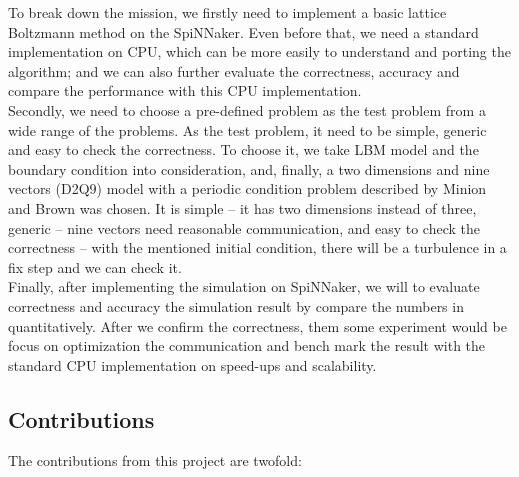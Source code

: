 To break down the mission, we firstly need to implement a basic lattice Boltzmann method on the SpiNNaker. Even before that, we need a standard implementation on CPU, which can be more easily to understand and porting the algorithm; and we can also further evaluate the correctness, accuracy and compare the performance with this CPU implementation.\\

Secondly, we need to choose a pre-defined problem as the test problem from a wide range of the problems. As the test problem, it need to be simple, generic and easy to check the correctness. To choose it, we take LBM model and the boundary condition into consideration, and, finally, a two dimensions and nine vectors (D2Q9) model with a periodic condition problem described by Minion and Brown \cite{minion1997performance} was chosen. It is simple -- it has two dimensions instead of three, generic -- nine vectors need reasonable communication, and easy to check the correctness -- with the mentioned initial condition, there will be a turbulence in a fix step and we can check it.\\

Finally, after implementing the simulation on SpiNNaker, we will to evaluate correctness and accuracy the simulation result by compare the numbers in quantitatively. After we confirm the correctness, them some experiment would be focus on optimization the communication and bench mark the result with the standard CPU implementation on speed-ups and scalability.\\

\subsection{Contributions}

The contributions from this project are twofold:\\

